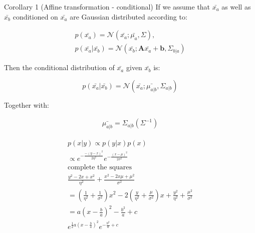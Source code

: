 \begin{wbox}{Corollary 1 (Affine transformation - conditional)}
    If we assume that $\bar{x_a}$ as well as $\bar{x_b}$ conditioned on $\bar{x_a}$ are Gaussian distributed according to:

    \begin{equation}
    \begin{aligned}
        p(\bar{x_a}) = \mathcal{N}(\bar{x_a}; \bar{\mu_a}, \Sigma), \\
        p(\bar{x_a}|\bar{x_b}) = \mathcal{N}(\bar{x_b}; \textbf{A}\bar{x_a} + \textbf{b}, \Sigma_{b|a} )  
    \end{aligned}
    \end{equation}

    Then the conditional distribution of $\bar{x_a}$ given $\bar{x_b}$  is:

    \begin{equation}
        p(\bar{x_a}|\bar{x_b}) = \mathcal{N}(\bar{x_a}; \bar{\mu_{a|b}}, \Sigma_{a|b})
    \end{equation}

    Together with:

    \begin{equation}
    \begin{aligned}
        \bar{{\mu_{a|b}}} = \Sigma_{a|b} (\Sigma^{-1})
    \end{aligned}
    \end{equation}



\end{wbox}

\begin{equation}
\begin{aligned}
    p(x|y) \propto p(y|x)p(x) \\
    \propto  e^{-\frac{-(y-x)^{2}} {2\eta^{2}} } e^{- \frac{(x-\mu)^{2}} {2 \sigma^{2}} } \\
    \text{complete the squares} \\
    \frac{y^{2} - 2x + x^{2}} {\eta^{2} } + \frac{x^{2}-2x\mu + \mu^{2}} {\sigma^{2}} \\
    = (\frac{1} {\eta^{2}} + \frac{1} {\sigma^{2}} ) x^{2} - 2(\frac{y} {\eta^{2}} + \frac{\mu} {\sigma^{2}} )x + \frac{y^{2}} {\eta^{2}} + \frac{\mu^{2}} {\sigma^{2}} \\
    = a (x- \frac{b} {a} )^{2} - \frac{b^{2}} {a} + c \\
    e^{\frac{1} {2}a(x - \frac{b} {a} )^{2} } e^{-\frac{b^{2}} {a} +c }
\end{aligned}
\end{equation}



% 
% 
% 
% 
% 